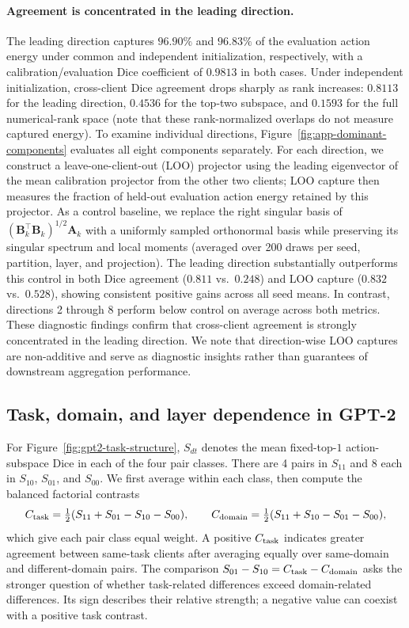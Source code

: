 \documentclass[11pt,letterpaper]{article}
\newcommand{\bA}{\mathbf{A}}
\newcommand{\bB}{\mathbf{B}}
\begin{document}
\paragraph{Agreement is concentrated in the leading direction.}
The leading direction captures $96.90\%$ and $96.83\%$ of the evaluation action energy under common and independent initialization, respectively, with a calibration/evaluation Dice coefficient of $0.9813$ in both cases. Under independent initialization, cross-client Dice agreement drops sharply as rank increases: $0.8113$ for the leading direction, $0.4536$ for the top-two subspace, and $0.1593$ for the full numerical-rank space (note that these rank-normalized overlaps do not measure captured energy). To examine individual directions, Figure~\ref{fig:app-dominant-components} evaluates all eight components separately. For each direction, we construct a leave-one-client-out (LOO) projector using the leading eigenvector of the mean calibration projector from the other two clients; LOO capture then measures the fraction of held-out evaluation action energy retained by this projector. As a control baseline, we replace the right singular basis of $(\bB_k^\top\bB_k)^{1/2}\bA_k$ with a uniformly sampled orthonormal basis while preserving its singular spectrum and local moments (averaged over 200 draws per seed, partition, layer, and projection). The leading direction substantially outperforms this control in both Dice agreement ($0.811$ vs.\ $0.248$) and LOO capture ($0.832$ vs.\ $0.528$), showing consistent positive gains across all seed means. In contrast, directions 2 through 8 perform below control on average across both metrics. These diagnostic findings confirm that cross-client agreement is strongly concentrated in the leading direction. We note that direction-wise LOO captures are non-additive and serve as diagnostic insights rather than guarantees of downstream aggregation performance.



\FloatBarrier
\subsection{Task, domain, and layer dependence in GPT-2}
\label{app:task-layer-diagnostics}

For Figure~\ref{fig:gpt2-task-structure}, $S_{dt}$ denotes the mean
fixed-top-$1$ action-subspace Dice in each of the four pair classes.
There are 4 pairs in $S_{11}$ and 8 each in $S_{10}$, $S_{01}$, and
$S_{00}$. We first average within each class, then compute the balanced
factorial contrasts
\begin{equation}
    C_{\rm task}=\tfrac12(S_{11}+S_{01}-S_{10}-S_{00}),\qquad
    C_{\rm domain}=\tfrac12(S_{11}+S_{10}-S_{01}-S_{00}),
\end{equation}
which give each pair class equal weight. A positive $C_{\rm task}$
indicates greater agreement between same-task clients after averaging
equally over same-domain and different-domain pairs. The comparison
$S_{01}-S_{10}=C_{\rm task}-C_{\rm domain}$ asks the stronger question
of whether task-related differences exceed domain-related differences.
Its sign describes their relative strength; a negative value can coexist
with a positive task contrast.
\end{document}
